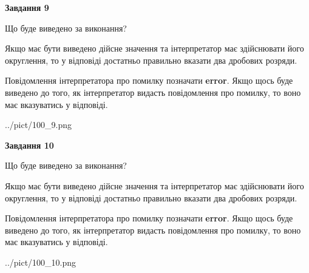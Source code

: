 \documentclass[12pt, ukrainian]{article}
\begin{document}
{\begin {Large}
{\begin {center}\textbf{Завдання 9}\end {center}}\par
Що буде виведено за виконання? \par

Якщо має бути виведено дійсне значення та інтерпретатор має здійснювати його округлення, 
то у відповіді достатньо правильно вказати два дробових розряди.

Повідомлення інтерпретатора про помилку позначати \textbf{error}.
Якщо щось буде виведено до того, як інтерпретатор видасть повідомлення про помилку, 
то воно має вказуватись у відповіді. \par

\begin{center}
	{../pict/100_9.png}
\end{center}
\newpage

{\begin {center}\textbf{Завдання 10}\end {center}}\par
Що буде виведено за виконання? \par

Якщо має бути виведено дійсне значення та інтерпретатор має здійснювати його округлення, 
то у відповіді достатньо правильно вказати два дробових розряди.

Повідомлення інтерпретатора про помилку позначати \textbf{error}.
Якщо щось буде виведено до того, як інтерпретатор видасть повідомлення про помилку, 
то воно має вказуватись у відповіді. \par

\begin{center}
	{../pict/100_10.png}
\end{center}
\newpage

\end {Large}}
\end{document}
